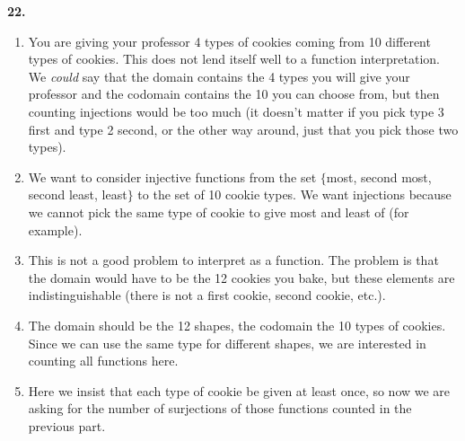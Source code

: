 \documentclass[10pt,]{book}
\theoremstyle{plain}
\theoremstyle{definition}
\theoremstyle{definition}
\theoremstyle{definition}
\numberwithin{equation}{chapter}
\begin{document}
\par\smallskip
\noindent\textbf{22.}\quad{}
          \leavevmode%
\begin{enumerate}[label=(\alph*)]
\item\hypertarget{li-771}{}
                You are giving your professor 4 types of cookies coming from 10 different types of cookies. This does not lend itself well to a function interpretation. We \emph{could} say that the domain contains the 4 types you will give your professor and the codomain contains the 10 you can choose from, but then counting injections would be too much (it doesn't matter if you pick type 3 first and type 2 second, or the other way around, just that you pick those two types).
\item\hypertarget{li-772}{}
                We want to consider injective functions from the set \(\{\)most, second most, second least, least\(\}\) to the set of 10 cookie types. We want injections because we cannot pick the same type of cookie to give most and least of (for example).
\item\hypertarget{li-773}{}
                This is not a good problem to interpret as a function. The problem is that the domain would have to be the 12 cookies you bake, but these elements are indistinguishable (there is not a first cookie, second cookie, etc.).
\item\hypertarget{li-774}{}
                The domain should be the 12 shapes, the codomain the 10 types of cookies. Since we can use the same type for different shapes, we are interested in counting all functions here.
\item\hypertarget{li-775}{}
                Here we insist that each type of cookie be given at least once, so now we are asking for the number of surjections of those functions counted in the previous part.
\end{enumerate}

\par\smallskip
\end{document}
